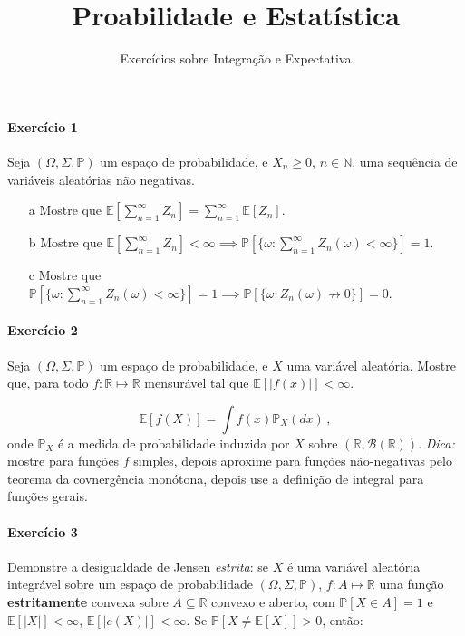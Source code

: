 \documentclass[10pt,a4paper]{article}
\title{\large Proabilidade e Estatística}
\author{\normalsize Exercícios sobre Integração e Expectativa}
\date{}
\begin{document}
	\maketitle
	\paragraph{Exercício 1} Seja $(\Omega, \Sigma, \mathbb{P})$ um espaço de probabilidade, e $X_n\geq0$, $n \in \mathbb{N}$, uma sequência de variáveis aleatórias não negativas.
	
	\begin{itemize}
		\item[a] Mostre que $\mathbb{E}[\sum_{n=1}^\infty Z_n] = \sum_{n=1}^\infty \mathbb{E}[Z_n]$.
		\item[b] Mostre que $\mathbb{E}[\sum_{n=1}^\infty Z_n] < \infty \implies \mathbb{P}[\{\omega:\sum_{n=1}^\infty Z_n(\omega) <\infty \}] = 1$.
		\item[c] Mostre que $\mathbb{P}[\{\omega:\sum_{n=1}^\infty Z_n(\omega) <\infty \}] = 1 \implies \mathbb{P}[\{\omega: Z_n(\omega)\nrightarrow 0\}] = 0$.
\end{itemize}

\paragraph{Exercício 2} Seja $(\Omega, \Sigma,\mathbb{P})$ um espaço de probabilidade, e $X$ uma variável aleatória. Mostre que, para todo $f: \mathbb{R} \mapsto \mathbb{R}$ mensurável tal que $\mathbb{E}[|f(x)|]<\infty$.

$$\mathbb{E}[f(X)] = \int f(x) \mathbb{P}_X(dx)\,, $$
onde $\mathbb{P}_X$ é a medida de probabilidade induzida por $X$ sobre $(\mathbb{R}, \mathcal{B}(\mathbb{R}))$. \textit{Dica:} mostre para funções $f$ simples, depois aproxime para funções não-negativas pelo teorema da covnergência monótona, depois use a definição de integral para funções gerais.

\paragraph{Exercício 3} Demonstre a desigualdade de Jensen \emph{estrita}: se $X$ é uma variável aleatória integrável sobre um espaço de probabilidade $(\Omega,\Sigma,\mathbb{P})$, $f: A \mapsto \mathbb{R}$ uma função \textbf{estritamente} convexa sobre $A \subseteq \mathbb{R}$ convexo e aberto, com $\mathbb{P}[X\in A] = 1$ e $\mathbb{E}[|X|]<\infty$, $\mathbb{E}[|c(X)|]<\infty$. Se $\mathbb{P}[X \neq \mathbb{E}[X]] > 0$, então:
\end{document}
